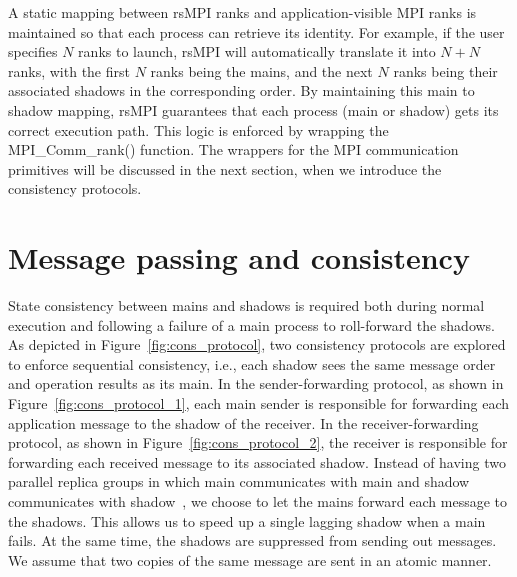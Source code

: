 A static mapping between rsMPI ranks and application-visible MPI ranks is maintained so that each process can retrieve its identity. For example, if the user specifies $N$ ranks to launch, rsMPI will automatically translate it into $N + N$ ranks, with the first $N$ ranks being the mains, and the next $N$ ranks being their associated shadows in the corresponding order. By maintaining this main to shadow mapping, rsMPI guarantees that each process (main or shadow) gets its correct execution path. 
This logic is enforced by wrapping the MPI\_Comm\_rank() function. %
The wrappers for the MPI communication primitives will be discussed in the next section, when we introduce the consistency protocols.

\section{Message passing and consistency}
\label{sec:msg_consistency}
State consistency between mains and shadows is required both during normal execution and following a failure of a main process to roll-forward the shadows. 
As depicted in Figure~\ref{fig:cons_protocol}, two consistency protocols are explored  
to enforce sequential consistency, i.e., each shadow sees the same message order and operation results as its main. In the sender-forwarding protocol, as shown in Figure~\ref{fig:cons_protocol_1}, each main sender is responsible for forwarding each application message to the shadow of the receiver. In the receiver-forwarding protocol, as shown in Figure~\ref{fig:cons_protocol_2}, the receiver is responsible for forwarding each received message to its associated shadow. 
Instead of having two parallel replica groups in which main communicates with main and shadow communicates with shadow~\cite{ferreira_sc_2011}, we choose to let the mains forward each message to the shadows. This allows us to speed up a single lagging shadow when a main fails. 
At the same time, the shadows are suppressed from sending out messages. 
We assume that two copies of the same message are sent in an atomic manner.

